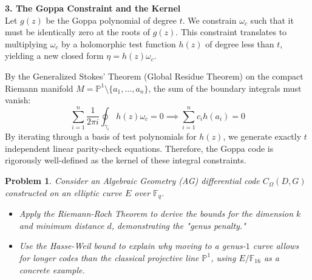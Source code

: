 \documentclass[11pt]{article}
\newtheorem{problem}{Problem}
\begin{document}
\begin{mdframed}[backgroundcolor=gray!5, linecolor=gray!50, linewidth=1pt]
\begin{center}
		\end{center}
		\vspace{0.5cm}
		
		\textbf{3. The Goppa Constraint and the Kernel} \\
		Let $g(z)$ be the Goppa polynomial of degree $t$. We constrain $\omega_c$ such that it must be identically zero at the roots of $g(z)$. This constraint translates to multiplying $\omega_c$ by a holomorphic test function $h(z)$ of degree less than $t$, yielding a new closed form $\eta = h(z)\omega_c$.
		
		By the Generalized Stokes' Theorem (Global Residue Theorem) on the compact Riemann manifold $M = \mathbb{P}^1 \setminus \{a_1, \dots, a_n\}$, the sum of the boundary integrals must vanish:
		$$ \sum_{i=1}^n \frac{1}{2\pi i} \oint_{\gamma_i} h(z) \omega_c = 0 \implies \sum_{i=1}^n c_i h(a_i) = 0 $$
		By iterating through a basis of test polynomials for $h(z)$, we generate exactly $t$ independent linear parity-check equations. Therefore, the Goppa code is rigorously well-defined as the kernel of these integral constraints.
	\end{mdframed}

	\newpage
	
	\begin{problem}
		Consider an Algebraic Geometry (AG) differential code $C_\Omega(D, G)$ constructed on an elliptic curve $E$ over $\mathbb{F}_q$. 
		\begin{itemize}
			\item[(a)] Apply the Riemann-Roch Theorem to derive the bounds for the dimension $k$ and minimum distance $d$, demonstrating the "genus penalty."
			\item[(b)] Use the Hasse-Weil bound to explain why moving to a genus-$1$ curve allows for longer codes than the classical projective line $\mathbb{P}^1$, using $E/\mathbb{F}_{16}$ as a concrete example.
		\end{itemize}
	\end{problem}
	
\end{document}
